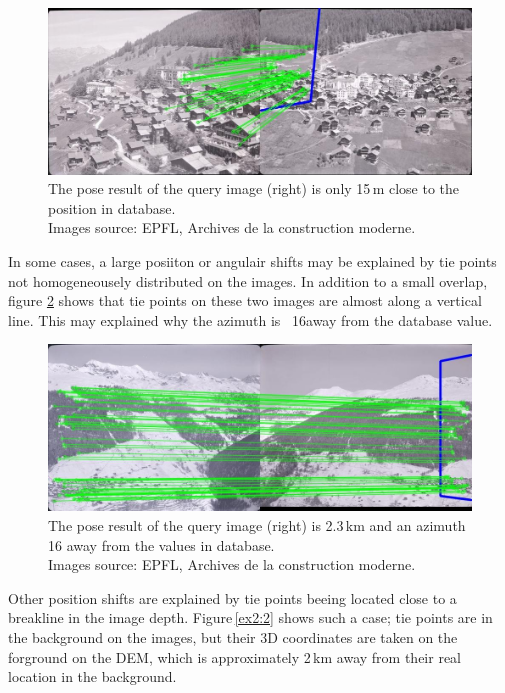 \documentclass[fleqn,10pt,lineno]{wlpeerj} %
\begin{document}
\begin{figure}[H]
\centering
\includegraphics[width=0.8\linewidth]{ex1.jpg}
\caption[These two images show a pose result that is 15\,m to the position in database.]
{The pose result of the query image (right) is only 15\,m close to the position in database.\\
Images source: EPFL, Archives de la construction moderne.}
\label{ex1}
\end{figure}


In some cases, a large posiiton or angulair shifts may be explained by tie points 
not homogeneousely distributed on the images. In addition to a small overlap,
figure \ref{ex3} shows that tie points on these two images are almost along a 
vertical line. This may explained why the azimuth is ~16\textdegree away from the
database value.


\begin{figure}[H]
\centering
\includegraphics[width=0.8\linewidth]{ex3.jpg}
\caption[These two images show a pose result that is 2.3\,km and an azimuth that is 16\textdegree 
away from the position in database.]
{The pose result of the query image (right) is 2.3\,km and an azimuth 16\textdegree 
away from the values in database. \\
Images source: EPFL, Archives de la construction moderne.}
\label{ex3}
\end{figure}


Other position shifts are explained by tie points beeing located close to a breakline
in the image depth. Figure\,\ref{ex2:2} shows such a case; tie points are in the 
background on the images, but their 3D coordinates are taken on the forground on 
the DEM, which is approximately 2\,km away from their real location in the background.
\end{document}

